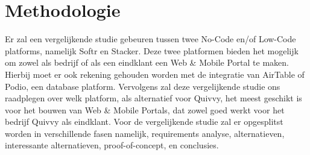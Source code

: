 






\section{Methodologie}%
\label{sec:methodologie}
Er zal een vergelijkende studie gebeuren tussen twee No-Code en/of Low-Code platforms, namelijk Softr en Stacker.
Deze twee platformen bieden het mogelijk om zowel als bedrijf of als een eindklant een Web \& Mobile Portal te maken.
Hierbij moet er ook rekening gehouden worden met de integratie van AirTable of Podio, een database platform. 
Vervolgens zal deze vergelijkende studie ons raadplegen over welk platform, als alternatief voor Quivvy, het meest geschikt is voor het bouwen van Web \& Mobile Portals,
dat zowel goed werkt voor het bedrijf Quivvy als eindklant. Voor de vergelijkende studie zal er opgesplitst worden in verschillende fasen namelijk,
requirements analyse, alternatieven, interessante alternatieven, proof-of-concept, en conclusies.
